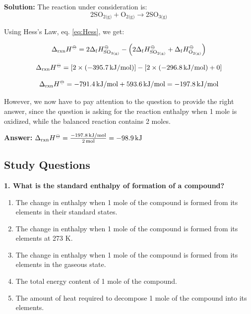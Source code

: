 \documentclass[
  9pt,
]{extbook}
\providecommand{\tightlist}{%
  \setlength{\itemsep}{0pt}\setlength{\parskip}{0pt}}
\theoremstyle{definition}
\theoremstyle{definition}
\theoremstyle{definition}
\theoremstyle{definition}
\theoremstyle{remark}
\begin{document}
\textbf{Solution:} The reaction under consideration is:
\[2\text{SO}_{2\text{(g)}}+ \text{O}_{2\text{(g)}} \rightarrow 2 \text{SO}_{3\text{(g)}}\]

Using Hess's Law, eq. \eqref{eq:Hess}, we get:

\[\Delta_{\text{rxn}} H^{-\kern-6pt{\ominus}\kern-6pt-}= 2 \Delta_{\mathrm{f}} H_{\text{SO}_{3\text{(g)}}}^{-\kern-6pt{\ominus}\kern-6pt-}- \left(2\Delta_{\mathrm{f}} H_{\text{SO}_{2\text{(g)}}}^{-\kern-6pt{\ominus}\kern-6pt-}+\Delta_{\mathrm{f}} H_{\text{O}_{2\text{(g)}}}^{-\kern-6pt{\ominus}\kern-6pt-}\right)\]

\[\Delta_{\text{rxn}} H^{-\kern-6pt{\ominus}\kern-6pt-}= \left[2 \times \left(-395.7 \, \text{kJ/mol}\right)\right] - \left[2 \times \left(-296.8 \, \text{kJ/mol}\right) + 0\right]\]

\[\Delta_{\text{rxn}} H^{-\kern-6pt{\ominus}\kern-6pt-}= -791.4 \, \text{kJ/mol} + 593.6 \, \text{kJ/mol} = -197.8 \, \text{kJ/mol}\]

However, we now have to pay attention to the question to provide the right answer, since the question is asking for the reaction enthalpy when 1 mole is oxidized, while the balanced reaction contains 2 moles.

\textbf{Answer:} \(\Delta_{\text{rxn}} H^{-\kern-6pt{\ominus}\kern-6pt-}= \frac{-197.8 \, \text{kJ/mol}}{2\,\text{mol}} = -98.9 \, \text{kJ}\)

\subsection{Study Questions}\label{quest4}

\textbf{1. What is the standard enthalpy of formation of a compound?}

\begin{enumerate}
\def\labelenumi{\alph{enumi}.}
\tightlist
\item
  The change in enthalpy when 1 mole of the compound is formed from its elements in their standard states.
\item
  The change in enthalpy when 1 mole of the compound is formed from its elements at 273 K.
\item
  The change in enthalpy when 1 mole of the compound is formed from its elements in the gaseous state.
\item
  The total energy content of 1 mole of the compound.
\item
  The amount of heat required to decompose 1 mole of the compound into its elements.
\end{enumerate}
\end{document}
